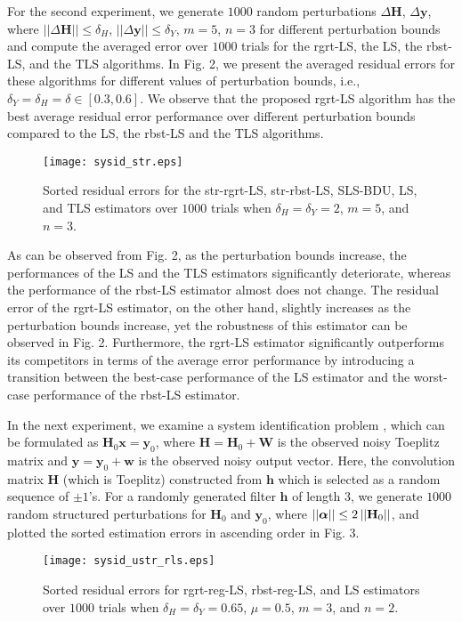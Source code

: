 \documentclass[review,sort&compress]{elsarticle}
\renewcommand{\vec}[1]{\mbox{$\mathbf{#1}$}}
\newcommand{\norm}[1]{\left|\left|#1\right|\right|}
\newcommand{\vH}{\vec{H}}
\newcommand{\vx}{\vec{x}}
\newcommand{\vy}{\vec{y}}
\newcommand{\dH}{\Delta\vH}
\newcommand{\dy}{\Delta\vy}
\newcommand{\vw}{\vec{w}}
\newcommand{\vh}{\vec{h}}
\newcommand{\vW}{\vec{W}}
\newcommand{\va}{\mbox{\boldmath$\alpha$}}
\begin{document}
For the second experiment, we generate $1000$ random perturbations $\dH$, $\dy$, where $\norm{\dH}\leq \delta_H$, $\norm{\dy}\leq \delta_Y$, $m=5$, $n=3$ for different perturbation bounds and compute the averaged error over $1000$ trials for the rgrt-LS, the LS, the rbst-LS, and the TLS algorithms. In Fig. 2, we present the averaged residual errors for these algorithms for different values of perturbation bounds, i.e., $\delta_Y=\delta_H = \delta \in [0.3, 0.6]$. We observe that the proposed rgrt-LS algorithm has the best average residual error performance over different perturbation bounds compared to the LS, the rbst-LS and the TLS algorithms.

\begin{figure}[t]
  \centering
  \texttt{[image: sysid\_str.eps]}\\
  \caption{Sorted residual errors for the str-rgrt-LS, str-rbst-LS, SLS-BDU, LS, and TLS estimators over $1000$ trials when $\delta_H = \delta_Y = 2$, $m=5$, and $n=3$.}\label{fig:sysid_str}
\end{figure}

As can be observed from Fig. 2, as the perturbation bounds increase, the performances of the LS and the TLS estimators significantly deteriorate, whereas the performance of the rbst-LS estimator almost does not change. The residual error of the rgrt-LS estimator, on the other hand, slightly increases as the perturbation bounds increase, yet the robustness of this estimator can be observed in Fig. 2. Furthermore, the rgrt-LS estimator significantly outperforms its competitors in terms of the average error performance by introducing a transition between the best-case performance of the LS estimator and the worst-case performance of the rbst-LS estimator.

In the next experiment, we examine a system identification problem \cite{pilanci10}, which can be formulated as $\vH_0 \vx=\vy_0$, where $\vH=\vH_0+\vW$ is the observed noisy Toeplitz matrix and $\vy=\vy_0+\vw$ is the observed noisy output vector. Here, the convolution matrix $\vH$ (which is Toeplitz) constructed from $\vh$ which is selected as a random sequence of $\pm 1$'s. For a randomly generated filter $\vh$ of length $3$, we generate $1000$ random structured perturbations for $\vH_0$ and $\vy_0$, where $\norm{\va}\leq 2 \norm{\vH_0}$, and plotted the sorted estimation errors in ascending order in Fig. 3.

\begin{figure}[t]
  \centering
  \texttt{[image: sysid\_ustr\_rls.eps]}\\
  \caption{Sorted residual errors for rgrt-reg-LS, rbst-reg-LS, and LS estimators over $1000$ trials when $\delta_H = \delta_Y = 0.65$, $\mu = 0.5$, $m=3$, and $n=2$.}\label{fig:sysid_ustr_rls}
\end{figure}
\end{document}
